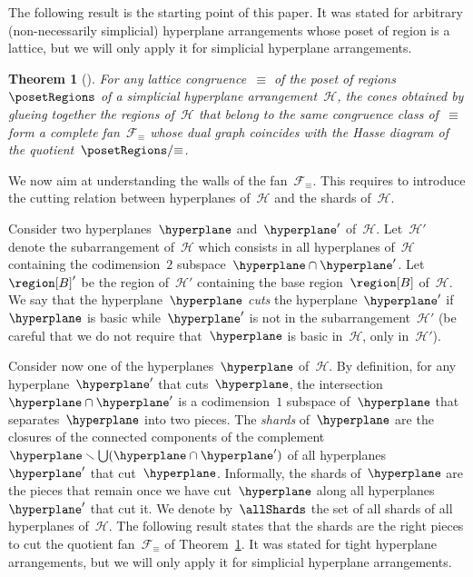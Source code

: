 \documentclass{amsart}
\newtheorem{theorem}{Theorem}%
\theoremstyle{definition}
\newcommand{\ssm}{\smallsetminus} %
\newcommand{\darkblue}{\color{darkblue}} %
\newcommand{\defn}[1]{\textsl{\darkblue #1}} %
\newcommand{\arrangement}{\mathcal{H}} %
\newcommand{\fanEquiv}{\mathcal{F}_\equiv} %
\begin{document}
The following result is the starting point of this paper.
It was stated for arbitrary (non-necessarily simplicial) hyperplane arrangements whose poset of region is a lattice, but we will only apply it for simplicial hyperplane arrangements.

\begin{theorem}[{\cite[Thm.~5.1]{Reading-HopfAlgebras}}]
\label{thm:fanQuotient}
For any lattice congruence~$\equiv$ of the poset of regions~$\posetRegions$ of a simplicial hyperplane arrangement~$\arrangement$, the cones obtained by glueing together the regions of~$\arrangement$ that belong to the same congruence class of~$\equiv$ form a complete fan~$\fanEquiv$ whose dual graph coincides with the Hasse diagram of the quotient~$\posetRegions/{\equiv}$.
\end{theorem}

We now aim at understanding the walls of the fan~$\fanEquiv$.
This requires to introduce the cutting relation between hyperplanes of~$\arrangement$ and the shards of~$\arrangement$.

Consider two hyperplanes~$\hyperplane$ and~$\hyperplane'$ of~$\arrangement$.
Let~$\arrangement'$ denote the subarrangement of~$\arrangement$ which consists in all hyperplanes of~$\arrangement$ containing the codimension~$2$ subspace~$\hyperplane \cap \hyperplane'$.
Let~$\region[B]'$ be the region of~$\arrangement'$ containing the base region~$\region[B]$ of~$\arrangement$.
We say that the hyperplane~$\hyperplane$ \defn{cuts} the hyperplane~$\hyperplane'$ if~$\hyperplane$ is basic while~$\hyperplane'$ is not in the subarrangement~$\arrangement'$ (be careful that we do not require that~$\hyperplane$ is basic in~$\arrangement$, only in~$\arrangement'$).

Consider now one of the hyperplanes~$\hyperplane$ of~$\arrangement$.
By definition, for any hyperplane~$\hyperplane'$ that cuts~$\hyperplane$, the intersection~$\hyperplane \cap \hyperplane'$ is a codimension~$1$ subspace of~$\hyperplane$ that separates~$\hyperplane$ into two pieces.
The \defn{shards} of~$\hyperplane$ are the closures of the connected components of the complement~$\hyperplane \ssm \bigcup (\hyperplane \cap \hyperplane')$ of all hyperplanes~$\hyperplane'$ that cut~$\hyperplane$.
Informally, the shards of~$\hyperplane$ are the pieces that remain once we have cut~$\hyperplane$ along all hyperplanes~$\hyperplane'$ that cut it.
We denote by~$\allShards$ the set of all shards of all hyperplanes of~$\arrangement$.
The following result states that the shards are the right pieces to cut the quotient fan~$\fanEquiv$ of Theorem~\ref{thm:fanQuotient}.
It was stated for tight hyperplane arrangements, but we will only apply it for simplicial hyperplane arrangements.
\end{document}
